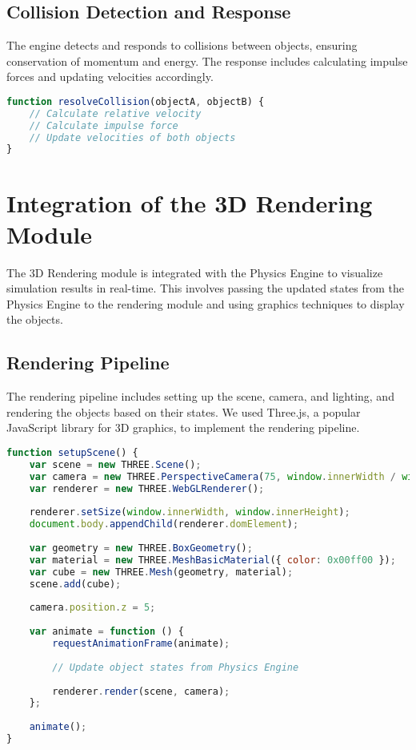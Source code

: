 \subsection{Collision Detection and Response}

The engine detects and responds to collisions between objects, ensuring conservation of momentum and energy. The response includes calculating impulse forces and updating velocities accordingly.

\begin{lstlisting}[language=JavaScript, caption=Collision Response]
function resolveCollision(objectA, objectB) {
    // Calculate relative velocity
    // Calculate impulse force
    // Update velocities of both objects
}
\end{lstlisting}

\section{Integration of the 3D Rendering Module}

The 3D Rendering module is integrated with the Physics Engine to visualize simulation results in real-time. This involves passing the updated states from the Physics Engine to the rendering module and using graphics techniques to display the objects.

\subsection{Rendering Pipeline}

The rendering pipeline includes setting up the scene, camera, and lighting, and rendering the objects based on their states. We used Three.js, a popular JavaScript library for 3D graphics, to implement the rendering pipeline.

\begin{lstlisting}[language=JavaScript, caption=Setting Up the 3D Scene with Three.js]
function setupScene() {
    var scene = new THREE.Scene();
    var camera = new THREE.PerspectiveCamera(75, window.innerWidth / window.innerHeight, 0.1, 1000);
    var renderer = new THREE.WebGLRenderer();
    
    renderer.setSize(window.innerWidth, window.innerHeight);
    document.body.appendChild(renderer.domElement);
    
    var geometry = new THREE.BoxGeometry();
    var material = new THREE.MeshBasicMaterial({ color: 0x00ff00 });
    var cube = new THREE.Mesh(geometry, material);
    scene.add(cube);
    
    camera.position.z = 5;
    
    var animate = function () {
        requestAnimationFrame(animate);
        
        // Update object states from Physics Engine
        
        renderer.render(scene, camera);
    };
    
    animate();
}
\end{lstlisting}

